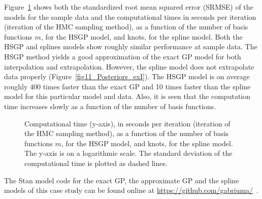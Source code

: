 Figure~\ref{fig14_time_exI} shows both the standardized root mean squared error (SRMSE) of the models for the sample data and the computational times in seconds per iteration (iteration of the HMC sampling method), as a function of the number of basis functions $m$, for the HSGP model, and knots, for the spline model. Both the HSGP and splines models show roughly similar performance at sample data. The HSGP method yields a good approximation of the exact GP model for both interpolation and extrapolation. However, the spline model does not extrapolate data properly (Figure~\ref{fig11_Posteriors_exI}). The HSGP model is on average roughly 400 times faster than the exact GP and 10 times faster than the spline model for this particular model and data. Also, it is seen that the computation time increases slowly as a function of the number of basis functions.

\begin{figure}[!h]
\centering
{}
\caption{Computational time (y-axis), in seconds per iteration (iteration of the HMC sampling method), as a function of the number of basis functions $m$, for the HSGP model, and knots, for the spline model. The y-axis is on a logarithmic scale. The standard deviation of the computational time is plotted as dashed lines.}
  \label{fig14_time_exI}
\end{figure}


The Stan model code for the exact GP, the approximate GP and the spline models of this case study can be found online at {\small \url{ https://github.com/gabriuma/}} \,.

